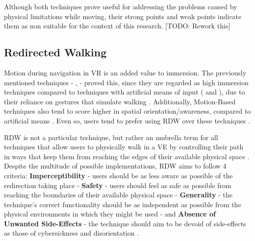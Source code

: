 Although both techniques prove useful for addressing the problems caused by physical limitations while moving, 
their strong points and weak points indicate them as non suitable for the context of this research. [TODO: Rework this]


\subsection{Redirected Walking}
\label{sec:redirected-walking}

Motion during navigation in \gls{VR} is an added value to immersion. The previously mentioned techniques - ,  
 - proved this, since they are regarded as high immersion techniques compared to techniques with artificial means of 
input ( and ), due to their reliance on gestures that simulate walking \cite{Nasiri2023}.
Additionally, Motion-Based techniques also tend to score higher in spatial orientation/awareness, compared to artificial means \cite{Cherni2020,Coomer2018}.
Even so, users tend to prefer using \gls{RDW} over these techniques \cite{Langbehn2018, Syamil2024}.

\gls{RDW} is not a particular technique, but rather an umbrella term for all techniques that allow users to physically walk in a 
\gls{VE} by controlling their path in ways that keep them from reaching the edges of their available physical space \cite{Nilsson2018}. 
Despite the multitude of possible implementations, \gls{RDW} aims to follow 4 criteria: \textbf{Imperceptibility} - users should be as less aware 
as possible of the redirection taking place - \textbf{Safety} - users should feel as safe as possible from reaching the boundaries of their 
available physical space - \textbf{Generality} - the technique's correct functionality should be as independent as possible from the physical 
environments in which they might be used - and \textbf{Absence of Unwanted Side-Effects} - the technique should aim to be devoid of 
side-effects as those of cybersickness and disorientation \cite{8255772}.

